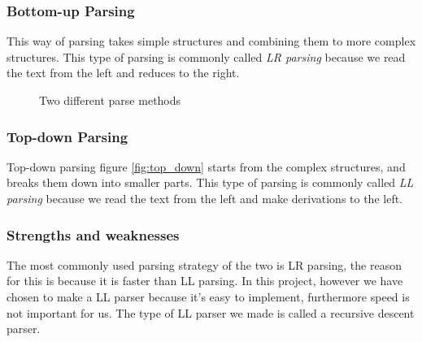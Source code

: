 		\subsubsection*{Bottom-up Parsing}
			This way of parsing takes simple structures and combining them to more complex structures.
			This type of parsing is commonly called {\it LR parsing} because we read the text from the left and reduces to the right.
			\begin{figure}[H]
				\centering
				\caption{Two different parse methods}\label{fig:parsers}
			\end{figure}
			
		\subsubsection*{Top-down Parsing}
			Top-down parsing figure \ref{fig:top_down} starts from the complex structures, and breaks them down into smaller parts.
			This type of parsing is commonly called {\it LL parsing} because we read the text from the left and make derivations to the left.
		
		\subsubsection*{Strengths and weaknesses}
			The most commonly used parsing strategy of the two is LR parsing, the reason for this is because it is faster than LL parsing.
			In this project, however we have chosen to make a LL parser because it's easy to implement, furthermore speed is not important for us. 
			The type of LL parser we made is called a recursive descent parser.
			
